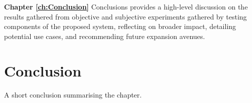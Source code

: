 \textbf{Chapter \ref{ch:Conclusion}} Conclusions provides a high-level discussion on the results gathered from objective and subjective experiments gathered by testing components of the proposed system, reflecting on broader impact, detailing potential use cases, and recommending future expansion avenues.

\section{Conclusion}
A short conclusion summarising the chapter.
